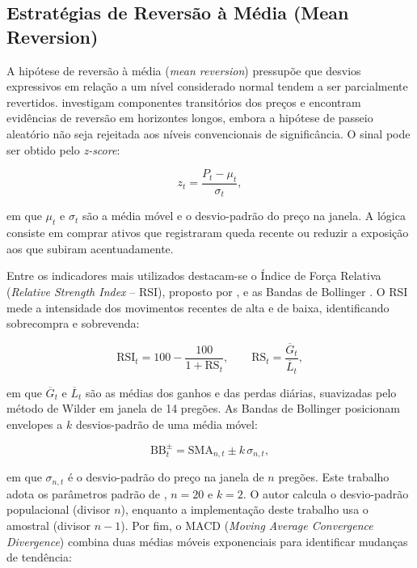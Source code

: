 \subsection{Estratégias de Reversão à Média (Mean Reversion)}

A hipótese de reversão à média (\textit{mean reversion}) pressupõe que desvios expressivos em relação a um nível considerado normal tendem a ser parcialmente revertidos. \citet{PoterbaSummers1988} investigam componentes transitórios dos preços e encontram evidências de reversão em horizontes longos, embora a hipótese de passeio aleatório não seja rejeitada aos níveis convencionais de significância. O sinal pode ser obtido pelo \textit{z-score}:

\begin{equation}
z_t = \frac{P_t - \mu_t}{\sigma_t},
\end{equation}

\noindent em que $\mu_t$ e $\sigma_t$ são a média móvel e o desvio-padrão do preço na janela. A lógica consiste em comprar ativos que registraram queda recente ou reduzir a exposição aos que subiram acentuadamente.

Entre os indicadores mais utilizados destacam-se o Índice de Força Relativa (\textit{Relative Strength Index} -- RSI), proposto por \citet{Wilder1978}, e as Bandas de Bollinger \citep{Bollinger2001}. O RSI mede a intensidade dos movimentos recentes de alta e de baixa, identificando sobrecompra e sobrevenda:

\begin{equation}
\mathrm{RSI}_t = 100 - \frac{100}{1 + \mathrm{RS}_t}, \qquad \mathrm{RS}_t = \frac{\overline{G}_t}{\overline{L}_t},
\end{equation}

\noindent em que $\overline{G}_t$ e $\overline{L}_t$ são as médias dos ganhos e das perdas diárias, suavizadas pelo método de Wilder em janela de 14 pregões. As Bandas de Bollinger posicionam envelopes a $k$ desvios-padrão de uma média móvel:

\begin{equation}
\mathrm{BB}^{\pm}_t = \mathrm{SMA}_{n,t} \pm k\,\sigma_{n,t},
\end{equation}

\noindent em que $\sigma_{n,t}$ é o desvio-padrão do preço na janela de $n$ pregões. Este trabalho adota os parâmetros padrão de \citet{Bollinger2001}, $n = 20$ e $k = 2$. O autor calcula o desvio-padrão populacional (divisor $n$), enquanto a implementação deste trabalho usa o amostral (divisor $n-1$). Por fim, o MACD (\textit{Moving Average Convergence Divergence}) combina duas médias móveis exponenciais para identificar mudanças de tendência:

